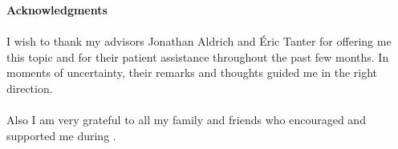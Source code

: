 
\vspace*{15\baselineskip}
\textbf{Acknowledgments}\\\\
I wish to thank my advisors Jonathan Aldrich and Éric Tanter for offering me this topic and for their patient assistance throughout the past few months. 
In moments of uncertainty, their remarks and thoughts guided me in the right direction.\\\\
Also I am very grateful to all my family and friends who encouraged and supported me during .